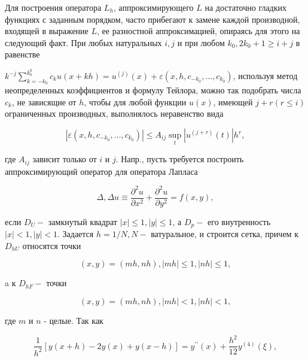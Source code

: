 \documentclass[10pt]{article}
\begin{document}
Для построения оператора $L_{h}$, аппроксимирующего $L$ на достаточно гладких функциях с заданным порядком, часто прибегают к замене каждой производной, входящей в выражение $L$, ее разностной аппроксимацией, опираясь для этого на следующий факт. При любых натуральных $i, j$ и при любом $k_{0}, 2 k_{0}+1 \geqslant i+j$ в равенстве



$k^{-j} \sum_{k=-k_{0}}^{k_{0}^{0}} c_{k} u(x+k h)=u^{(j)}(x)+\varepsilon\left(x, h, c_{-k_{0}}, \ldots, c_{k_{0}}\right)$, используя метод неопределенных коэффициентов и формулу Тейлора, можно так подобрать числа $c_{k}$, не зависящие от $h$, чтобы для любой функции $u(x)$, имеющей $j+r(r \leqslant i)$ ограниченных производных, выполнялось неравенство вида



\[

\left|\varepsilon\left(x, h, c_{-k_{0}}, \ldots, c_{k_{0}}\right)\right| \leqslant A_{i j} \sup _{t}\left|u^{(j+r)}(t)\right| h^{r},

\]



где $A_{i j}$ зависит только от $i$ и $j$. Напр., пусть требуется построить аппроксимирующий оператор для оператора Лапласа



\[

\Delta, \Delta u \equiv \frac{\partial^{2} u}{\partial x^{2}}+\frac{\partial^{2} u}{\partial y^{2}}=f(x, y),

\]



если $D_{U}-$ замкнутый квадрат $|x| \leqslant 1,|y| \leqslant 1$, а $D_{p}-$ его внутренность $|x|<1,|y|<1$. Задается $h=1 / N, N-$ ватуральное, и строится сетка, причем к $D_{h U}$ относятся точки



\[

(x, y)=(m h, n h),|m h| \leqslant 1,|n h| \leqslant 1,

\]



a к $D_{h F}-$ точки



\[

(x, y)=(m h, n h),|m h|<1,|n h|<1,

\]



где $m$ и $n$ - целые. Так как



\[

\frac{1}{h^{2}}[y(x+h)-2 y(x)+y(x-h)]=y^{\prime \prime}(x)+\frac{h^{2}}{12} y^{(4)}(\xi),

\]
\end{document}
